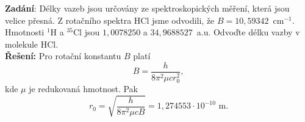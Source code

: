 \begin{priklad}
\textbf{Zadání}: Délky vazeb jsou určovány ze spektroskopických měření, která jsou velice přesná. Z rotačního spektra HCl jsme odvodili, že $B=10{,}59342$~cm$^{-1}$. Hmotnosti $^1$H a $^{35}$Cl jsou $1{,}0078250$ a $34{,}9688527$~a.u. Odvoďte délku vazby v molekule HCl.\\[0.1cm]
\textbf{Řešení:} Pro rotační konstantu $B$ platí
\begin{displaymath}
B = \frac{h}{8 \pi^2 \mu c r_0^2},
\end{displaymath} 
kde $\mu$ je redukovaná hmotnost. Pak
\begin{displaymath}
r_0 = \sqrt{\frac{h}{8 \pi^2 \mu c B}} = 1{,}274553 \cdot 10^{-10} \mbox{ m}.
\end{displaymath} \vspace{-0.7cm}
\end{priklad}